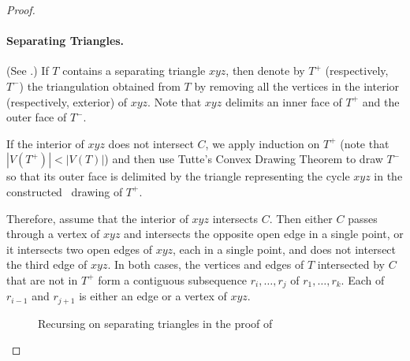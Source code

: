 \begin{proof}
	
	
	\paragraph{Separating Triangles.}
	(See .)
	If $T$ contains a separating triangle $xyz$, then denote by $T^+$ (respectively, $T^-$) the triangulation obtained from $T$ by removing all the vertices in the interior (respectively, exterior) of $xyz$. Note that $xyz$ delimits an inner face of $T^+$ and the outer face of $T^-$. 
	
	If the interior of $xyz$ does not intersect $C$, we apply induction on $T^+$ (note that $|V(T^+)|<|V(T)|$) and then use Tutte's Convex Drawing Theorem  \cite{tutte:how} to draw $T^-$ so that its outer face is delimited by the triangle representing the cycle $xyz$ in the constructed \Fary\ drawing of $T^+$.
	
	Therefore, assume that the interior of $xyz$ intersects $C$. Then either $C$ passes through a vertex of $xyz$ and intersects the opposite open edge in a single point, or it intersects two open edges of $xyz$, each in a single point, and does not intersect the third edge of $xyz$. 
	In both cases, the vertices and edges of $T$ intersected by $C$ that are not in $T^+$ form a contiguous
	subsequence $r_i,\ldots,r_j$ of $r_1,\ldots,r_k$. Each of $r_{i-1}$ and $r_{j+1}$ is either an edge or a vertex of $xyz$.  
	
	\begin{figure}
		\caption{Recursing on separating triangles in the proof of
			}
	\end{figure}
	

\end{proof}
